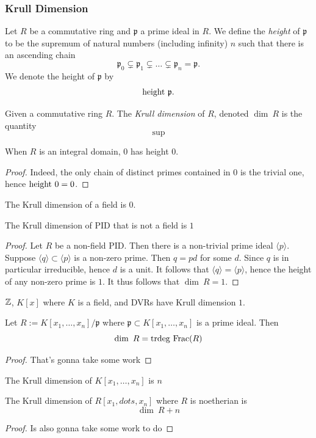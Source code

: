 \subsubsection{Krull Dimension}
\begin{definition}
    Let $R$ be a commutative ring and $\mathfrak{p}$ a prime ideal in $R$. We define the \emph{height} of $\mathfrak{p}$ to be the supremum of natural numbers (including infinity) $n$ such that there is an ascending chain 
    $$
        \mathfrak{p}_0\subsetneq \mathfrak{p}_1\subsetneq\dots \subsetneq \mathfrak{p}_n = \mathfrak{p}.
    $$
    We denote the height of $\mathfrak{p}$ by 
    $$
        \mathrm{height}\ \mathfrak{p}.
    $$
\end{definition}
\begin{definition}
    Given a commutative ring $R$. The \emph{Krull dimension} of $R$, denoted $\dim \ R$ is the quantity
    $$
        \sup 
    $$
\end{definition}
\begin{lemma}
    When $R$ is an integral domain, $0$ has height $0$. 
\end{lemma}
\begin{proof}
    Indeed, the only chain of distinct primes contained in $0$ is the trivial one, hence $\mathrm{height} \ 0 = 0$. 
\end{proof}
\begin{corollary}
    The Krull dimension of a field is $0$. 
\end{corollary}
\begin{lemma}
    The Krull dimension of PID that is not a field is $1$
\end{lemma}
\begin{proof}
    Let $R$ be a non-field PID. Then there is a non-trivial prime ideal $\langle p\rangle$. Suppose $\langle q\rangle \subset \langle p\rangle$ is a non-zero prime. Then $q=pd$ for some $d$. Since $q$ is in particular irreducible, hence $d$ is a unit. It follows that $\langle q\rangle =\langle p\rangle$, hence the height of any non-zero prime is $1$. It thus follows that $\dim \ R = 1$. 
\end{proof}
\begin{corollary}
    $\mathbb{Z}$, $K[x]$ where $K$ is a field, and DVRs have Krull dimension $1$.
\end{corollary}
\begin{lemma}\label{TranscendenceDegreeAndKrullDimensionCorrespond}
    Let $R:= K[x_1,\dots,x_n]/\mathfrak{p}$ where $\mathfrak{p}\subset K[x_1,\dots,x_n]$ is a prime ideal. Then 
    $$
        \dim \ R = \trdeg\ \mathrm{Frac}(R)
    $$
\end{lemma}
\begin{proof}
    {\Large That's gonna take some work}
\end{proof}
\begin{corollary}
    The Krull dimension of $K[x_1,\dots,x_n]$ is $n$
\end{corollary}
\begin{lemma}
    The Krull dimension of $R[x_1,dots,x_n]$ where $R$ is noetherian is 
    $$
        \dim \ R + n
    $$
\end{lemma}
\begin{proof}
    {\Large Is also gonna take some work to do} 
\end{proof}
